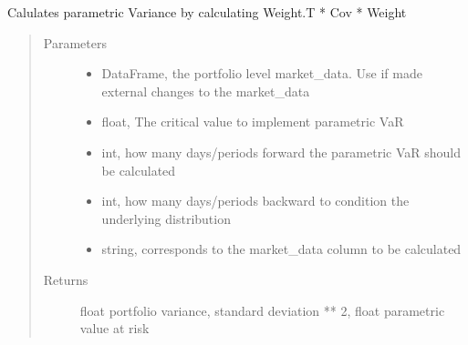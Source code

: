 \documentclass[letterpaper,10pt,english]{sphinxmanual}
\begin{document}
\begin{fulllineitems}
\begin{fulllineitems}
\label{\detokenize{securities:risk_dash.securities.Portfolio.set_port_variance}}
\sphinxAtStartPar
Calulates parametric Variance by calculating Weight.T * Cov * Weight
\begin{quote}\begin{description}
\item[{Parameters}] \leavevmode\begin{itemize}
\item {} 
\sphinxAtStartPar
{} \textendash{} DataFrame, the portfolio level market\_data. Use if made external changes to the market\_data

\item {} 
\sphinxAtStartPar
{} \textendash{} float, The critical value to implement parametric VaR

\item {} 
\sphinxAtStartPar
{} \textendash{} int, how many days/periods forward the parametric VaR should be calculated

\item {} 
\sphinxAtStartPar
{} \textendash{} int, how many days/periods backward to condition the underlying distribution

\item {} 
\sphinxAtStartPar
{} \textendash{} string, corresponds to the market\_data column to be calculated

\end{itemize}

\item[{Returns}] \leavevmode
\sphinxAtStartPar
float portfolio variance, standard deviation ** 2, float parametric value at risk

\end{description}\end{quote}


\end{fulllineitems}
\end{fulllineitems}
\end{document}
